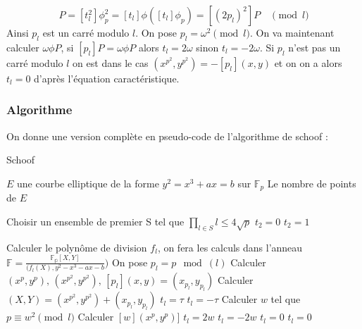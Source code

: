 \documentclass{article}
\begin{document}
\begin{equation}
[t_l^2 p_l]P = [t_l^2] \phi_p^2 = [t_l] \phi ([t_l] \phi_p) = [(2p_l)^2]P \quad \pmod{l}
\end{equation}
Ainsi $p_l$ est un carré modulo $l$. On pose $p_l = \omega^2 \pmod{l}$. On va maintenant calculer $\omega \phi P$, si $[p_l]P = \omega \phi P$ alors $t_l = 2\omega$ sinon $t_l = -2\omega$.
\newline
\medskip
Si $p_l$ n'est pas un carré modulo $l$ on est dans le cas $(x^{p^2}, y^{p^2}) = - [p_l](x,y)$ et on on a alors $t_l = 0$ d'après l'équation caractéristique. 

\newpage
\subsubsection{Algorithme}
On donne une version complète en pseudo-code de l'algorithme de schoof : 

\begin{algorithm}
\caption{Schoof}
\begin{algorithmic}
\REQUIRE $E$ une courbe elliptique de la forme $y^2 = x^3 + ax = b$ sur $\mathbb{F}_p$
\ENSURE Le nombre de points de $E$

\STATE Choisir un ensemble de premier S tel que $\prod_{l \in S}l \leq 4\sqrt{p}$
\STATE $t_2 = 0$
\ELSE
\STATE $t_2 = 1$
\ENDIF

\STATE Calculer le polynôme de division $f_l$, on fera les calculs dans l'anneau $\mathbb{F}= \frac{\mathbb{F_p}[X,Y]}{(f_l(X), y^2 -x^3 - ax - b})$
\STATE On pose $p_l = p \mod(l)$
\STATE Calculer $(x^p, y^p), \, (x^{p^2}, y^{p^2}), \, [p_l](x, y) = (x_{p_l}, y_{p_l})$
\STATE Calculer $(X, Y) = (x^{p^2}, y^{p^2}) + (x_{p_l}, y_{p_l})$
\STATE $t_l = \tau$
\ELSE 
\STATE $t_l = - \tau$
\ENDIF
\ENDIF
\ENDFOR
\ELSE
{}
\STATE Calculer $w$ tel que $p \equiv w^2 \pmod l$ 
\STATE Calculer $[w](x^p,y^p)]$
\IF{$[w](x^p,y^p)] = (x^{p^2}, y^{p^2})$}
\STATE $t_l = 2w$
\ENDIF
\IF{$[w](x^p,y^p)] = (x^{p^2}, -y^{p^2})$}
\STATE $t_l = -2w$
\ELSE
\STATE $t_l =0$
\ENDIF
\ELSE
\STATE $t_l = 0$

\ENDIF
\ENDIF
\ENDFOR
\end{algorithmic}
\end{algorithm}
\end{document}
